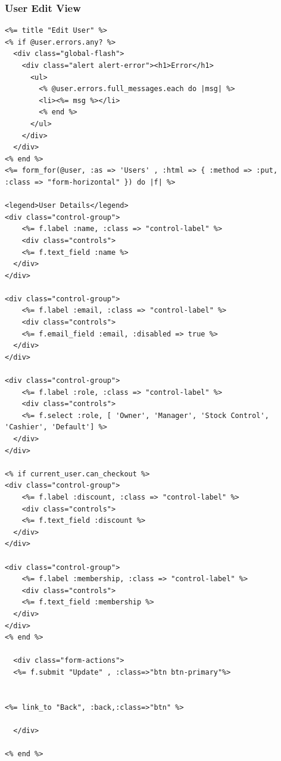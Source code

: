 \documentclass[a4paper]{article}
\begin{document}
\subsubsection{User Edit View}
\begin{verbatim}
<%= title "Edit User" %>
<% if @user.errors.any? %>
  <div class="global-flash">
    <div class="alert alert-error"><h1>Error</h1>
      <ul>
        <% @user.errors.full_messages.each do |msg| %>
        <li><%= msg %></li>
        <% end %>
      </ul>
    </div>
  </div>
<% end %>
<%= form_for(@user, :as => 'Users' , :html => { :method => :put, :class => "form-horizontal" }) do |f| %>
  
<legend>User Details</legend>
<div class="control-group">
    <%= f.label :name, :class => "control-label" %>
    <div class="controls">
    <%= f.text_field :name %>
  </div>
</div>

<div class="control-group">
    <%= f.label :email, :class => "control-label" %>
    <div class="controls">
    <%= f.email_field :email, :disabled => true %>
  </div>
</div>

<div class="control-group">
    <%= f.label :role, :class => "control-label" %>
    <div class="controls">
    <%= f.select :role, [ 'Owner', 'Manager', 'Stock Control', 'Cashier', 'Default'] %>
  </div>
</div>

<% if current_user.can_checkout %>
<div class="control-group">
    <%= f.label :discount, :class => "control-label" %>
    <div class="controls">
    <%= f.text_field :discount %>
  </div>
</div>

<div class="control-group">
    <%= f.label :membership, :class => "control-label" %>
    <div class="controls">
    <%= f.text_field :membership %>
  </div>
</div>
<% end %>

  <div class="form-actions">
  <%= f.submit "Update" , :class=>"btn btn-primary"%>


<%= link_to "Back", :back,:class=>"btn" %>

  </div>

<% end %>



\end{verbatim}
\end{document}
